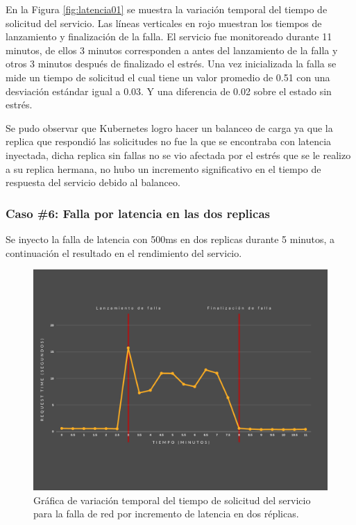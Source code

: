\par En la Figura \ref{fig:latencia01} se muestra la variación temporal del tiempo de solicitud del servicio. Las líneas verticales en rojo muestran los tiempos de lanzamiento y finalización de la falla. El servicio fue monitoreado durante 11 minutos, de ellos 3 minutos corresponden a antes del lanzamiento de la falla y otros 3 minutos después de finalizado el estrés. Una vez inicializada la falla se mide un tiempo de solicitud el cual tiene un valor promedio de 0.51 con una desviación estándar igual a 0.03. Y una diferencia de 0.02 sobre el estado sin estrés.\\

\par Se pudo observar que Kubernetes logro hacer un balanceo de carga ya que la replica que respondió las solicitudes no fue la que se encontraba con latencia inyectada, dicha replica sin fallas no se vio afectada por el estrés que se le realizo a su replica hermana, no hubo un incremento significativo en el tiempo de respuesta del servicio debido al balanceo.\\


\subsubsection{Caso \#6: Falla por latencia en las dos replicas}

\par Se inyecto la falla de latencia con 500ms en dos replicas durante 5 minutos, a continuación el resultado en el rendimiento del servicio.\\

\begin{figure}[htpb!]
	\centering
	\includegraphics[width=0.95\columnwidth]{images/graficasexperimentos/latencia2.png}
	\caption{Gráfica de variación temporal del tiempo de solicitud del servicio para la falla de red por incremento de latencia en dos r\'eplicas.}
	\label{fig:latencia02}
\end{figure}

